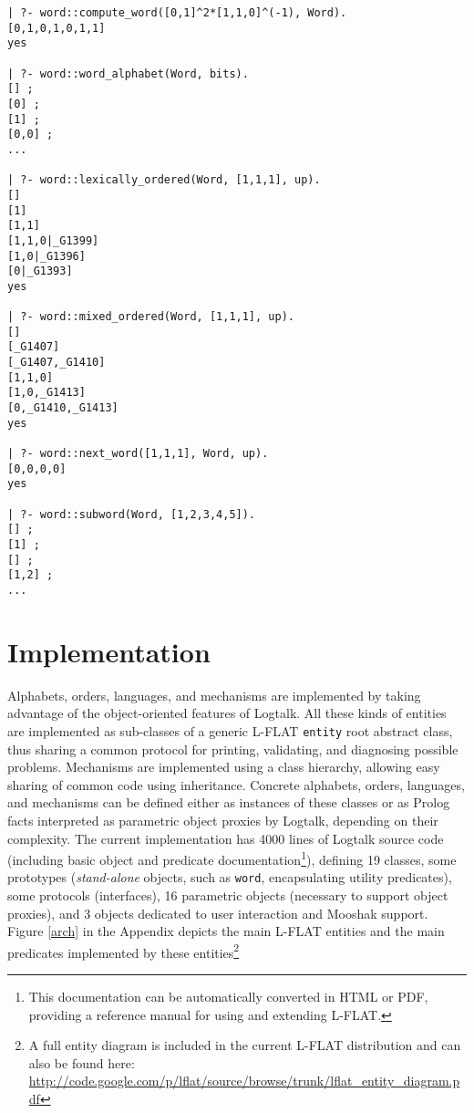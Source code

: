 \documentclass{llncs}
\begin{document}
\begin{lstlisting}[caption={Using the \lstinline{word} utility predicates}, label=wordex]
| ?- word::compute_word([0,1]^2*[1,1,0]^(-1), Word).
[0,1,0,1,0,1,1]
yes

| ?- word::word_alphabet(Word, bits).
[] ;
[0] ;
[1] ;
[0,0] ;
...

| ?- word::lexically_ordered(Word, [1,1,1], up).
[]
[1]
[1,1]
[1,1,0|_G1399]
[1,0|_G1396]
[0|_G1393]
yes

| ?- word::mixed_ordered(Word, [1,1,1], up).
[]
[_G1407]
[_G1407,_G1410]
[1,1,0]
[1,0,_G1413]
[0,_G1410,_G1413]
yes

| ?- word::next_word([1,1,1], Word, up).
[0,0,0,0]
yes

| ?- word::subword(Word, [1,2,3,4,5]).
[] ;
[1] ;
[] ;
[1,2] ;
...
\end{lstlisting}


\section{Implementation}

Alphabets, orders, languages, and mechanisms are implemented by taking advantage of the object-oriented features of Logtalk. All these kinds of entities are implemented as sub-classes of a generic L-FLAT \lstinline{entity} root abstract class, thus sharing a common protocol for printing, validating, and diagnosing possible problems. Mechanisms are implemented using a class hierarchy, allowing easy sharing of common code using inheritance. Concrete alphabets, orders, languages, and mechanisms can be defined either as instances of these classes or as Prolog facts interpreted as parametric object proxies by Logtalk, depending on their complexity. The current implementation has 4000 lines of Logtalk source code (including basic object and predicate documentation\footnote{This documentation can be automatically converted in HTML or PDF, providing a reference manual for using and extending L-FLAT.}), defining 19 classes, some prototypes (\textsl{stand-alone} objects, such as \lstinline{word}, encapsulating utility predicates), some protocols (interfaces), 16 parametric objects (necessary to support object proxies), and 3 objects dedicated to user interaction and Mooshak support. Figure \ref{arch} in the Appendix depicts the main L-FLAT entities and the main predicates implemented by these entities\footnote{A full entity diagram is included in the current L-FLAT distribution and can also be found here: \url{http://code.google.com/p/lflat/source/browse/trunk/lflat_entity_diagram.pdf}}
\end{document}
